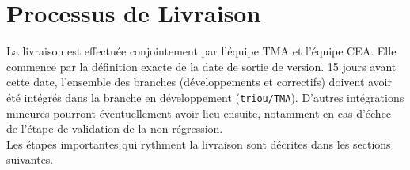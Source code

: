 
\newpage
\chapter{\label{chapitre:livraison}Processus de Livraison}
La livraison est effectuée conjointement par l'équipe TMA et l'équipe CEA.
Elle commence par la définition exacte de la date de sortie de version.
15 jours avant cette date, l'ensemble des branches (développements et correctifs) doivent avoir
été intégrés dans la branche en développement (\texttt{triou/TMA}).
D'autres intégrations mineures pourront éventuellement avoir lieu ensuite,
notamment en cas d'échec de l'étape de validation de la non-régression.\\
Les étapes importantes qui rythment la livraison sont décrites dans les sections suivantes.

